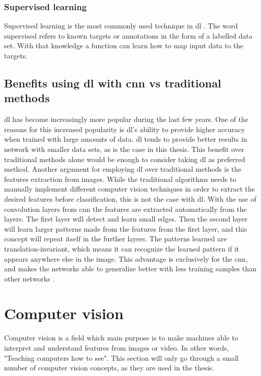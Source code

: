 \documentclass[USenglish]{ifimaster}  %
\begin{document}
\subsubsection{Supervised learning}
Supervised learning is the most commonly used technique in \ac{dl} \cite{Francois_Deep_learning_with_python}. The word supervised refers to known targets or annotations in the form of a labelled data set. With that knowledge a function can learn how to map input data to the targets.

\subsection{Benefits using \ac{dl} with \ac{cnn} vs traditional methods}
\ac{dl} has become increasingly more popular during the last few years. One of the reasons for this increased popularity is \ac{dl}’s ability to provide higher accuracy when trained with large amounts of data. \ac{dl} tends to provide better results in network with smaller data sets, as is the case in this thesis. This benefit over traditional methods alone would be enough to consider taking \ac{dl} as preferred method.
\newline
\newline
Another argument for employing \ac{dl} over traditional methods is the features extraction from images. While the traditional algorithms needs to manually implement different computer vision techniques in order to extract the desired features before classification, this is not the case with \ac{dl}. With the use of convolution layers from \ac{cnn} the features are extracted automatically from the layers.
The first layer will detect and learn small edges. Then the second layer will learn larger patterns made from the features from the first layer, and this concept will repeat itself in the further layers. The patterns learned are translation-invariant, which means it can recognize the learned pattern if it appears anywhere else in the image. This advantage is exclusively for the \ac{cnn}, and makes the networks able to generalize better with less training samples than other networks  \cite{Francois_Deep_learning_with_python}.

\section{Computer vision}
Computer vision is a field which main purpose is to make machines able to interpret and understand features from images or video. In other words, "Teaching computers how to see"\cite{website:maskinsyn-intro}. This section will only go through a small number of computer vision concepts, as they are used in the thesis.
\end{document}
